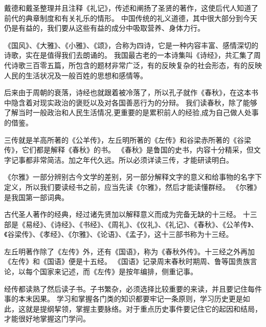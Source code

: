 \documentclass[avery5371,grid]{flashcards}
\begin{document}
{戴德和戴圣整理并且注释《礼记》，传述和阐扬了圣贤的著作，这使后代人知道了前代的典章制度和有关礼乐的情形。} %
{中国传统的礼义道德，其中很大部分到今天仍是有益的，我们要从这些有益的成分中吸取营养、身体力行。} %

{《国风》、《大雅》、《小雅》、《颂》，合称为四诗，它是一种内容丰富、感情深切的诗歌，实在是值得我们去朗诵的。} %
{我国最古老的一本诗集叫《诗经》，共汇集了周代诗歌三百零五篇，所包含的题材非常广泛，有的反映复杂的社会形态，有的反映人民的生活状况及一般百姓的思想和感情等。} %

{后来由于周朝的衰落，诗经也就跟着被冷落了，所以孔子就作《春秋》，在这本书中隐含着对现实政治的褒贬以及对各国善恶行为的分辩。} %
{我们读春秋，除了能够了解当时一般政治和人民生活情况,更重要的是累积前人的经验,成为自己做人处事的借鉴。} %

{三传就是羊高所著的《公羊传》，左丘明所著的《左传》和谷梁赤所著的《谷梁传》，它们都是解释《春秋》的书。} %
{《春秋》是鲁国的史书，内容十分精采，但文字记事都非常简洁。加之年代久远。所以必须详读三传，才能研读明白。} %



{《尔雅》一部分辨别古今文学的差别，另一部分解释文字的意义和给事物的名字下定义，所以我们要读经书之前，应当先读《尔雅》，然后才能读懂群经。} %
{《尔雅》是我国第一部词典。} %

{古代圣人著作的经典，经过诸先贤加以解释意义而成为完备无缺的十三经。} %
{十三部是《易经》、《诗经》、《书经》、《周礼》、《仪礼》、《礼记》、《春秋》、《公羊传》、《谷梁传》、《孝经》、《尔雅》、《论语》、《孟子》，这十三部书称为十三经。} %

{左丘明著作除了《左传》外，还有《国语》，称为《春秋外传》。十三经之外再加《左传》和《国语》便是十五经。} %
{《国语》记录周末春秋时期周、鲁等国贵族言论，以每个国家来记述，而《左传》是按年编排，侧重记事。} %


{经传都读熟了然后读子书。子书繁杂，必须选择比较重要的来读，并且要记住每件事的本末因果。} %
{学习和掌握各门类的知识都要牢记一条原则，学习历史更是如此，这就是提纲挈领，掌握主要脉络。对于重点历史事件要记住它的起因和结局，才能很好地掌握这门学问。} %
\end{document}
